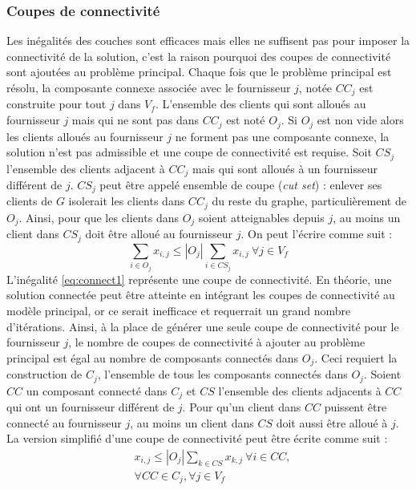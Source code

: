 \documentclass[letterpaper]{article}
\begin{document}
\subsubsection*{Coupes de connectivité}
Les inégalités des couches sont efficaces mais elles ne suffisent pas pour imposer la connectivité de la solution, c'est la raison pourquoi des coupes de connectivité sont ajoutées au problème principal. \newline \indent
Chaque fois que le problème principal est résolu, la composante connexe associée avec le fournisseur $j$, notée $CC_{j}$ est construite pour tout $j$ dans $V_{f}$. L'ensemble des clients qui sont alloués au fournisseur $j$ mais qui ne sont pas dans $CC_{j}$ est noté $O_{j}$.\newline \indent
Si $O_{j}$ est non vide alors les clients alloués au fournisseur $j$ ne forment pas une composante connexe, la solution n'est pas admissible et une coupe de connectivité est requise. Soit $CS_{j}$ l'ensemble des clients adjacent à $CC_{j}$ mais qui sont alloués à un fournisseur différent de $j$. $CS_{j}$ peut être appelé ensemble de coupe (\textit{cut set}) : enlever ses clients de $G$ isolerait les clients dans $CC_{j}$ du reste du graphe, particulièrement de $O_{j}$. Ainsi, pour que les clients dans $O_{j}$ soient atteignables depuis $j$, au moins un client dans $CS_{j}$ doit être alloué au fournisseur $j$. On peut l'écrire comme suit : 
\begin{equation}\label{eq:connect1}
\sum_{i \in O_{j}}{x_{i,j}} \leq |O_{j}|\sum_{i \in CS_{j}}{x_{i,j}} \ \forall j \in V_{f}
\end{equation}
L'inégalité \eqref{eq:connect1} représente une coupe de connectivité. En théorie, une solution connectée peut être atteinte en intégrant les coupes de connectivité au modèle principal, or ce serait inefficace et requerrait un grand nombre d'itérations. Ainsi, à la place de générer une seule coupe de connectivité pour le fournisseur $j$, le nombre de coupes de connectivité à ajouter au problème principal est égal au nombre de composants connectés dans $O_{j}$. Ceci requiert la construction de $C_{j}$, l'ensemble de tous les composants connectés dans $O_{j}$. Soient $CC$ un composant connecté dans $C_{j}$ et $CS$ l'ensemble des clients adjacents à $CC$  qui ont un fournisseur différent de $j$. Pour qu'un client dans $CC$ puissent être connecté au fournisseur $j$, au moins un client dans $CS$ doit aussi être alloué à $j$. La version simplifié d'une coupe de connectivité peut être écrite comme suit :
\begin{align*}
&x_{i,j} \leq |O_{j}|\sum_{k \in CS}{x_{k,j}} \ \forall i \in CC, \\ 
&\forall CC \in C_{j}, \forall j \in V_{f}\\ 
\end{align*}
\end{document}
